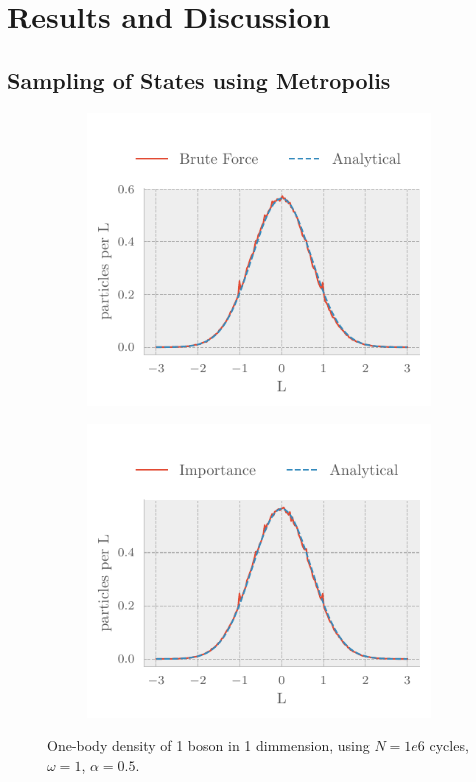 \section{Results and Discussion}\label{sec:Discussion}
\subsection{Sampling of States using Metropolis}

\begin{figure}[ht]
	\begin{subfigure}{\columnwidth}
		\centering
		\includegraphics[]{figures/density1.pdf}
		\label{fig:sfig1}
	\end{subfigure}%
	\begin{subfigure}{\columnwidth}
		\centering
		\includegraphics[]{figures/density2.pdf}
		\label{fig:sfig2}
	\end{subfigure}
	\caption{One-body density of 1 boson in 1 dimmension, using $N = 1e6$ cycles, $\omega = 1$, $\alpha = 0.5$.}
	\label{fig:1 part 1 dim density}
\end{figure}

